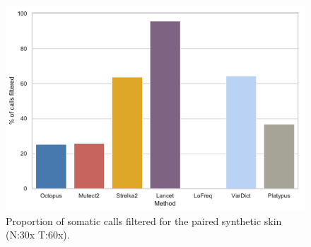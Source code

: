 \documentclass{article}
\begin{document}
\clearpage

\begin{figure}[ht!]
    \includegraphics[width=\textwidth]{figures/filtering}
    \caption{Proportion of somatic calls filtered for the paired synthetic skin (N:30x T:60x).}
    \label{supfig:filtering}
\end{figure}

\clearpage
\end{document}
